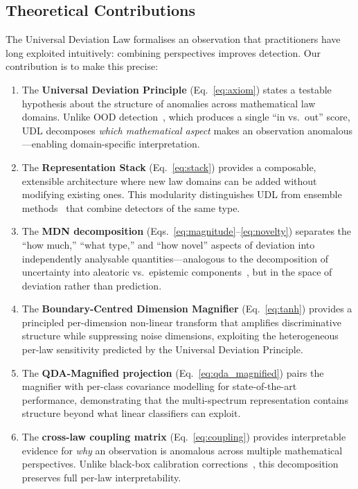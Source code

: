 \documentclass[journal]{IEEEtran}
\begin{document}
\subsection{Theoretical Contributions}

The Universal Deviation Law formalises an observation that practitioners have long exploited intuitively: combining perspectives improves detection. Our contribution is to make this precise:

\begin{enumerate}
  \item The \textbf{Universal Deviation Principle} (Eq.~\eqref{eq:axiom}) states a testable hypothesis about the structure of anomalies across mathematical law domains. Unlike OOD detection~\cite{hendrycks2017baseline,liang2018odin,liu2020energy}, which produces a single ``in vs.\ out'' score, UDL decomposes \textit{which mathematical aspect} makes an observation anomalous---enabling domain-specific interpretation.
  \item The \textbf{Representation Stack} (Eq.~\eqref{eq:stack}) provides a composable, extensible architecture where new law domains can be added without modifying existing ones. This modularity distinguishes UDL from ensemble methods~\cite{lazarevic2005feature} that combine detectors of the same type.
  \item The \textbf{MDN decomposition} (Eqs.~\eqref{eq:magnitude}--\eqref{eq:novelty}) separates the ``how much,'' ``what type,'' and ``how novel'' aspects of deviation into independently analysable quantities---analogous to the decomposition of uncertainty into aleatoric vs.\ epistemic components~\cite{lakshminarayanan2017ensembles}, but in the space of deviation rather than prediction.
  \item The \textbf{Boundary-Centred Dimension Magnifier} (Eq.~\eqref{eq:tanh}) provides a principled per-dimension non-linear transform that amplifies discriminative structure while suppressing noise dimensions, exploiting the heterogeneous per-law sensitivity predicted by the Universal Deviation Principle.
  \item The \textbf{QDA-Magnified projection} (Eq.~\eqref{eq:qda_magnified}) pairs the magnifier with per-class covariance modelling for state-of-the-art performance, demonstrating that the multi-spectrum representation contains structure beyond what linear classifiers can exploit.
  \item The \textbf{cross-law coupling matrix} (Eq.~\eqref{eq:coupling}) provides interpretable evidence for \textit{why} an observation is anomalous across multiple mathematical perspectives. Unlike black-box calibration corrections~\cite{guo2017calibration}, this decomposition preserves full per-law interpretability.
\end{enumerate}
\end{document}
